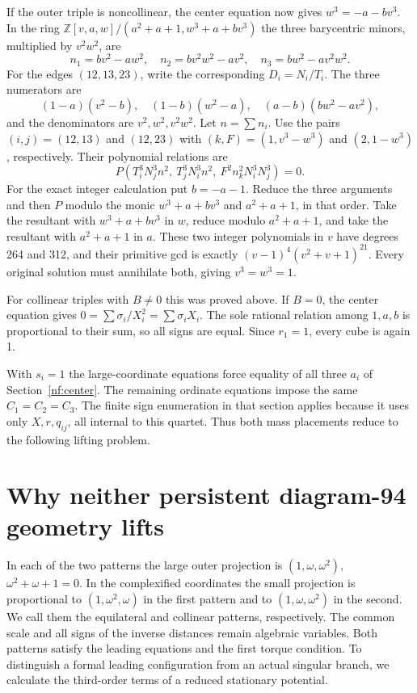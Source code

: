 \documentclass[11pt,letterpaper]{article}
\theoremstyle{definition}
\begin{document}
If the outer triple is noncollinear, the center equation now gives $w^3=-a-bv^3$. In the ring $\mathbb Z[v,a,w]/(a^2+a+1,w^3+a+bv^3)$ the three barycentric minors, multiplied by $v^2w^2$, are
\[
 n_1=bv^2-aw^2,\quad n_2=bv^2w^2-av^2,\quad n_3=bw^2-av^2w^2 .
\]
For the edges $(12,13,23)$, write the corresponding $D_i=N_i/T_i$. The three numerators are
\[
 (1-a)(v^2-b),\quad (1-b)(w^2-a),\quad (a-b)(bw^2-av^2),
\]
and the denominators are $v^2,w^2,v^2w^2$. Let $n=\sum n_i$. Use the pairs $(i,j)=(12,13)$ and $(12,23)$ with $(k,F)=(1,v^3-w^3)$ and $(2,1-w^3)$, respectively. Their polynomial relations are
\[
 P\left(T_i^3N_j^3n^2,\ T_j^3N_i^3n^2,\ F^2 n_k^2 N_i^3N_j^3\right)=0 .
\]
For the exact integer calculation put $b=-a-1$. Reduce the three arguments and then $P$ modulo the monic $w^3+a+bv^3$ and $a^2+a+1$, in that order. Take the resultant with $w^3+a+bv^3$ in $w$, reduce modulo $a^2+a+1$, and take the resultant with $a^2+a+1$ in $a$. These two integer polynomials in $v$ have degrees 264 and 312, and their primitive gcd is exactly $(v-1)^4(v^2+v+1)^{21}$. Every original solution must annihilate both, giving $v^3=w^3=1$.

For collinear triples with $B\ne0$ this was proved above. If $B=0$, the center equation gives $0=\sum\sigma_i/X_i^2=\sum\sigma_i X_i$. The sole rational relation among $1,a,b$ is proportional to their sum, so all signs are equal. Since $r_1=1$, every cube is again 1.

With $s_i=1$ the large-coordinate equations force equality of all three
$a_i$ of Section~\ref{nf:center}. The remaining ordinate equations impose
the same $C_1=C_2=C_3$. The finite sign enumeration in that section applies
because it uses only $X,r,q_{ij}$, all internal to this quartet. Thus both
mass placements reduce to the following lifting problem.

\section{Why neither persistent diagram-94 geometry lifts}\label{nf:lift}
In each of the two patterns the large outer projection is
$(1,\omega,\omega^2)$, $\omega^2+\omega+1=0$. In the complexified
coordinates the small projection is proportional to $(1,\omega^2,\omega)$
in the first pattern and to $(1,\omega,\omega^2)$ in the second. We call
them the equilateral and collinear patterns, respectively. The common scale
and all signs of the inverse distances remain algebraic variables.
Both patterns satisfy the leading equations and the first torque condition.
To distinguish a formal leading configuration from an actual singular branch,
we calculate the third-order terms of a reduced stationary potential.
\end{document}
